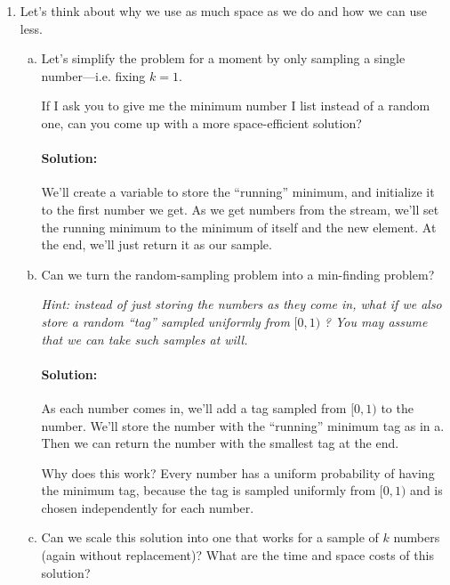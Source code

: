 \documentclass{article}
\begin{document}
\begin{enumerate}[1.]
\clearpage
\item %
  Let's think about why we use as much space as we do and how we can use less.
  
  \begin{enumerate}[a.]
  \item %
    Let's simplify the problem for a moment by only sampling a single
    number---i.e. fixing $k=1$.

    If I ask you to give me the minimum number I list instead of a random one,
    can you come up with a more space-efficient solution?

    \paragraph{Solution:} We'll create a variable to store the ``running''
    minimum, and initialize it to the first number we get. As we get numbers
    from the stream, we'll set the running minimum to the minimum of itself and
    the new element. At the end, we'll just return it as our sample.

  \item %
    Can we turn the random-sampling problem into a min-finding problem?

    \smallskip

    \textit{Hint: instead of just storing the numbers as they come in, what if
      we also store a random ``tag'' sampled uniformly from} $[0, 1)$
    \textit{? You may assume that we can take such samples at will.}

    \paragraph{Solution:} As each number comes in, we'll add a tag sampled from
    $[0, 1)$ to the number. We'll store the number with the ``running'' minimum
    tag as in a. Then we can return the number with the smallest tag at the end.

    Why does this work? Every number has a uniform probability of having the
    minimum tag, because the tag is sampled uniformly from $[0, 1)$ and is
    chosen independently for each number.

  \item %
    Can we scale this solution into one that works for a sample of $k$ numbers
    (again without replacement)? What are the time and space costs of this
    solution?


\end{enumerate}
\end{enumerate}
\end{document}
